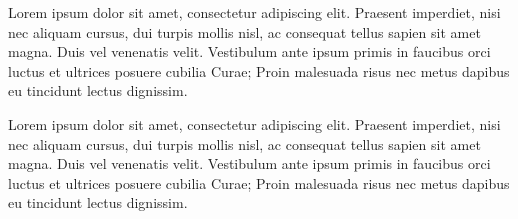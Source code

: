 Lorem ipsum dolor sit amet, consectetur adipiscing elit. Praesent imperdiet, nisi 
nec aliquam cursus, dui turpis mollis nisl, ac consequat tellus sapien sit amet 
magna. Duis vel venenatis velit. Vestibulum ante ipsum primis in faucibus orci 
luctus et ultrices posuere cubilia Curae; Proin malesuada risus nec metus dapibus 
eu tincidunt lectus dignissim. 

Lorem ipsum dolor sit amet, consectetur adipiscing elit. Praesent imperdiet, nisi 
nec aliquam cursus, dui turpis mollis nisl, ac consequat tellus sapien sit amet 
magna. Duis vel venenatis velit. Vestibulum ante ipsum primis in faucibus orci 
luctus et ultrices posuere cubilia Curae; Proin malesuada risus nec metus dapibus 
eu tincidunt lectus dignissim. 